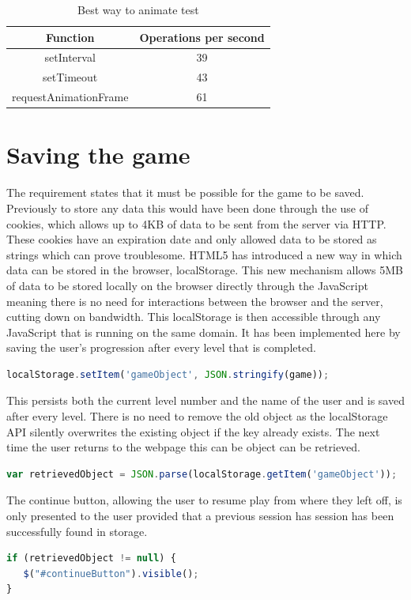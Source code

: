\documentclass[12pt,a4paper]{report}
\begin{document}
\begin{table}[ht]
\centering
\begin{adjustbox}{width=1\textwidth}
\small
\begin{tabular}{ c | c }
  \hline
 Function & Operations per second \\ \hline 
    setInterval & 39 \\
    setTimeout & 43 \\
    requestAnimationFrame & 61 \\
   \hline
\end{tabular}
\end{adjustbox}
\caption{Best way to animate test} 
\end{table} 

\section{Saving the game}
The requirement states that it must be possible for the game to be saved. 
Previously to store any data this would have been done through the use of cookies, which allows up to 4KB of data to be sent from the server via HTTP. These cookies have an expiration date and only allowed data to be stored as strings which can prove troublesome. HTML5 has introduced a new way in which data can be stored in the browser, localStorage. This new mechanism allows 5MB of data to be stored locally on the browser directly through the JavaScript meaning there is no need for interactions between the browser and the server, cutting down on bandwidth. This localStorage is then accessible through any JavaScript that is running on the same domain. It has been implemented here by saving the user’s progression after every level that is completed.

\begin{lstlisting}[language=JavaScript]
localStorage.setItem('gameObject', JSON.stringify(game));
\end{lstlisting}
This persists both the current level number and the name of the user and is saved after every level. There is no need to remove the old object as the localStorage API silently overwrites the existing object if the key already exists.
The next time the user returns to the webpage this can be object can be retrieved.
\begin{lstlisting}[language=JavaScript]
var retrievedObject = JSON.parse(localStorage.getItem('gameObject'));
\end{lstlisting}
The continue button, allowing the user to resume play from where they left off, is only presented to the user provided that a previous session has session has been successfully found in storage.
\begin{lstlisting}[language=JavaScript]
if (retrievedObject != null) {
   $("#continueButton").visible();
}

\end{lstlisting}
\end{document}
